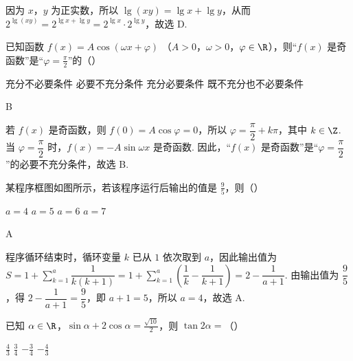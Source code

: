 \begin{solution}
因为 \(x\)，\(y\) 为正实数，所以 \(\lg(xy)=\lg x+\lg y\)，从而 \(2^{\lg(xy)}=2^{\lg x+\lg y}=2^{\lg x}\cdot2^{\lg y}\)，故选 D.
\end{solution}

\begin{problem}
已知函数 \( f(x) = A\cos (\omega x + \varphi)  \) （\(A > 0\)，\(\omega > 0\)，\(\varphi \in \R\)），则“\(f(x)\) 是奇函数”是“\( \varphi = \frac{\pi}{2} \)”的（\quad）

\choices
    {充分不必要条件}
    {必要不充分条件}
    {充分必要条件}
    {既不充分也不必要条件}
\end{problem}

\begin{answer}
B
\end{answer}

\begin{solution}
若 \(f(x)\) 是奇函数，则 \(f(0)=A\cos\varphi=0\)，所以 \(\varphi=\dfrac{\pi}{2}+k\pi\)，其中 \(k\in\Z\). 当 \(\varphi=\dfrac{\pi}{2}\) 时，\(f(x)=-A\sin\omega x\) 是奇函数. 因此，“\(f(x)\) 是奇函数”是“\(\varphi=\dfrac{\pi}{2}\)”的必要不充分条件，故选 B.
\end{solution}

\begin{problem}
某程序框图如图所示，若该程序运行后输出的值是 \(\frac{9}{5}\)，则（\quad）


\choices
    {\(a = 4\)}
    {\(a = 5\)}
    {\(a = 6\)}
    {\(a = 7\)}
\end{problem}

\begin{answer}
A
\end{answer}

\begin{solution}
程序循环结束时，循环变量 \(k\) 已从 \(1\) 依次取到 \(a\)，因此输出值为
\(S=1+\displaystyle\sum_{k=1}^{a}\dfrac{1}{k(k+1)}=1+\displaystyle\sum_{k=1}^{a}\left(\dfrac{1}{k}-\dfrac{1}{k+1}\right)=2-\dfrac{1}{a+1}\). 由输出值为 \(\dfrac{9}{5}\)，得 \(2-\dfrac{1}{a+1}=\dfrac{9}{5}\)，即 \(a+1=5\)，所以 \(a=4\)，故选 A.
\end{solution}

\begin{problem}
已知 \(\alpha \in \R\)，\(\sin \alpha + 2\cos \alpha = \frac{\sqrt{10}}{2}\)，则 \(\tan 2\alpha =\)（\quad）

\choices
    {\(\frac{4}{3}\)}
    {\( \frac{3}{4} \)}
    {\(-\frac{3}{4}\)}
    {\(-\frac{4}{3}\)}
\end{problem}

